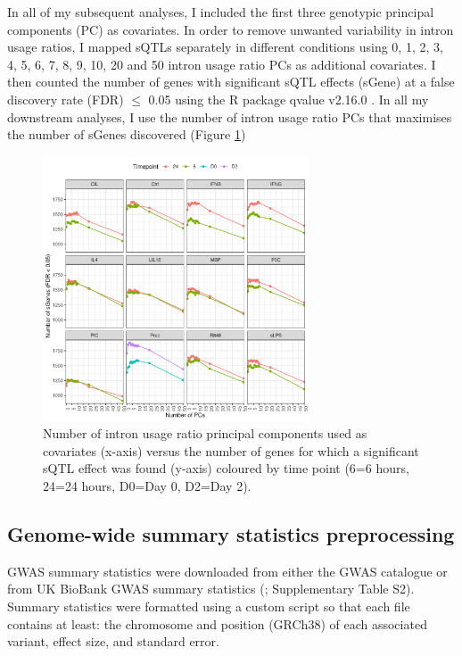 In all of my subsequent analyses, I included the first three genotypic principal components (PC) as covariates. In order to remove unwanted variability in intron usage ratios, I mapped sQTLs separately in different conditions using 0, 1, 2, 3, 4, 5, 6, 7, 8, 9, 10, 20 and 50  intron usage ratio PCs as additional covariates. I then counted the number of genes with significant sQTL effects (sGene) at a false discovery rate (FDR) $\leq$ 0.05 using the R package qvalue v2.16.0 \cite{Storey2003-zd}. In all my downstream analyses, I use the number of intron usage ratio PCs that maximises the number of sGenes discovered (Figure \ref{fig:num_sgenes_PCs})

\begin{figure}[H]
  \centering
  \includegraphics[width=0.7\textwidth]{num_sgenes_PCs}
  \caption{Number of intron usage ratio principal components used as
  covariates (x-axis) versus the number of genes for which a significant sQTL effect was found
  (y-axis) coloured by time point (6=6 hours, 24=24 hours, D0=Day 0, D2=Day 2).}
  \label{fig:num_sgenes_PCs}   
\end{figure}


\subsection{Genome-wide summary statistics preprocessing}
GWAS summary statistics were downloaded from either the GWAS catalogue \cite{Buniello2019-wb} or from UK BioBank GWAS summary statistics (\cite{Zhou2018-jh}; Supplementary Table S2). Summary statistics were formatted using a custom script so that each file contains at least: the chromosome and position (GRCh38) of each associated variant, effect size, and standard error. 


